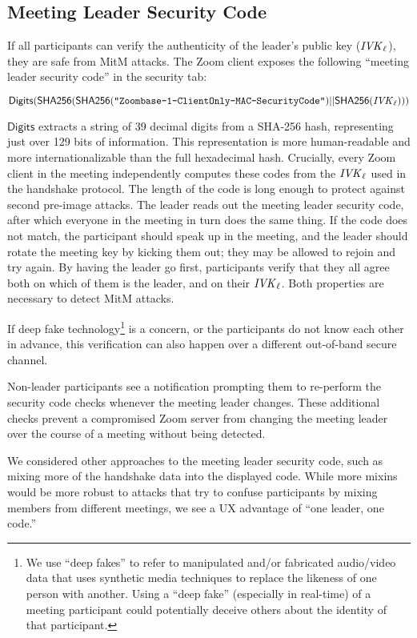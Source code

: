 \subsection{Meeting Leader Security Code}\label{subsec:securitycode} If all participants can verify
the authenticity of the leader's public key ($\mathit{IVK}_{\ell}$), they are safe from MitM attacks. The
Zoom client exposes the following ``meeting leader security code'' in the security tab:

$$\mathsf{Digits}({\sf SHA256}({\sf SHA256}(\texttt{"Zoombase-1-ClientOnly-MAC-SecurityCode"}) ||
{\sf SHA256}(\mathit{IVK}_{\ell})))$$

$\mathsf{Digits}$ extracts a string of 39 decimal digits from a SHA-256 hash, representing just over
129 bits of information. This representation is more human-readable and more internationalizable
than the full hexadecimal hash. Crucially, every Zoom client in the meeting independently computes
these codes from the $\mathit{IVK}_{\ell}$ used in the handshake protocol. The length of the code is long
enough to protect against second pre-image attacks. The leader reads out the meeting leader security
code, after which everyone in the meeting in turn does the same thing. If the code does not match,
the participant should speak up in the meeting, and the leader should rotate the meeting key by
kicking them out; they may be allowed to rejoin and try again. By having the leader go first,
participants verify that they all agree both on which of them is the leader, and on their
$\mathit{IVK}_{\ell}$. Both properties are necessary to detect MitM attacks.

If deep fake technology\footnote{We use ``deep fakes'' to refer to manipulated and/or fabricated
audio/video data that uses synthetic media techniques to replace the likeness of one person with
another. Using a ``deep fake'' (especially in real-time) of a meeting participant could potentially
deceive others about the identity of that participant.} is a concern, or the participants do not
know each other in advance, this verification can also happen over a different out-of-band secure
channel.

Non-leader participants see a notification prompting them to re-perform the security code checks
whenever the meeting leader changes. These additional checks prevent a compromised Zoom server from
changing the meeting leader over the course of a meeting without being detected.

We considered other approaches to the meeting leader security code, such as mixing more of the
handshake data into the displayed code. While more mixins would be more robust to attacks that try
to confuse participants by mixing members from different meetings, we see a UX advantage of ``one
leader, one code.''

